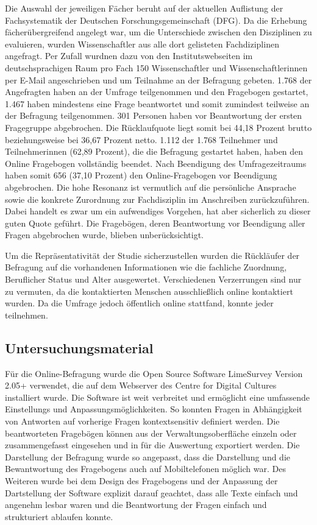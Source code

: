 Die Auswahl der jeweiligen Fächer beruht auf der aktuellen Auflistung der Fachsystematik der Deutschen Forschungsgemeinschaft (DFG). Da die Erhebung fächerübergreifend angelegt war, um die Unterschiede zwischen den Disziplinen zu evaluieren, wurden Wissenschaftler aus alle dort gelisteten Fachdiziplinen angefragt. Per Zufall wurdnen dazu von den Institutswebseiten im deutschsprachigen Raum pro Fach 150 Wissenschaftler und Wissenschaftlerinnen per E-Mail angeschrieben und um Teilnahme an der Befragung gebeten. 1.768 der Angefragten haben an der Umfrage teilgenommen und den Fragebogen gestartet, 1.467 haben mindestens eine Frage beantwortet und somit zumindest teilweise an der Befragung teilgenommen. 301 Personen haben vor Beantwortung der ersten Fragegruppe abgebrochen. Die Rücklaufquote liegt somit bei 44,18 Prozent brutto beziehungsweise bei 36,67 Prozent netto. 1.112 der 1.768 Teilnehmer und Teilnehmerinnen (62,89 Prozent), die die Befragung gestartet haben, haben den Online Fragebogen vollständig beendet. Nach Beendigung des Umfragezeitraums haben somit 656 (37,10 Prozent) den Online-Fragebogen vor Beendigung abgebrochen. Die hohe Resonanz ist vermutlich auf die persönliche Ansprache sowie die konkrete Zurordnung zur Fachdisziplin im Anschreiben zurückzuführen. Dabei handelt es zwar um ein aufwendiges Vorgehen, hat aber sicherlich zu dieser guten Quote geführt. Die Fragebögen, deren Beantwortung vor Beendigung aller Fragen abgebrochen wurde, blieben unberücksichtigt. 

Um die Repräsentativität der Studie sicherzustellen wurden die Rückläufer der Befragung auf die vorhandenen Informationen wie die fachliche Zuordnung, Beruflicher Status und Alter ausgewertet. Verschiedenen Verzerrungen sind nur zu vermuten, da die kontaktierten Menschen ausschließlich online kontaktiert wurden. Da die Umfrage jedoch öffentlich online stattfand, konnte jeder teilnehmen.

\subsection{Untersuchungsmaterial}

Für die Online-Befragung wurde die Open Source Software LimeSurvey Version 2.05+ verwendet, die auf dem Webserver des Centre for Digital Cultures installiert wurde. Die Software ist weit verbreitet und ermöglicht eine umfassende Einstellungs und Anpassungsmöglichkeiten. So konnten Fragen in Abhängigkeit von Antworten auf vorherige Fragen kontextsensitiv definiert werden. Die beantworteten Fragebögen können aus der Verwaltungsoberfläche einzeln oder zusammengefasst eingesehen und in für die Auswertung exportiert werden. Die Darstellung der Befragung wurde so angepasst, dass die Darstellung und die Bewantwortung des Fragebogens auch auf Mobiltelefonen möglich war. Des Weiteren wurde bei dem Design des Fragebogens und der Anpassung der Dartstellung der Software explizit darauf geachtet, dass alle Texte einfach und angenehm lesbar waren und die Beantwortung der Fragen einfach und strukturiert ablaufen konnte.

